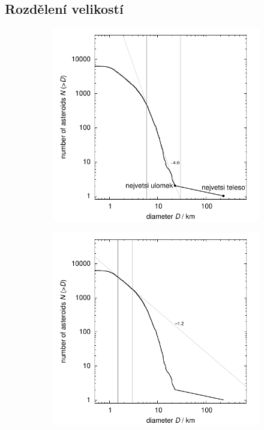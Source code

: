 \documentclass[A4paper, 12pt, oneside, openany]{book}
\begin{document}
\subsection{Rozdělení velikostí}
\begin{figure}
	\centering
	\begin{subfigure}[b]{0.45\textwidth}
	\includegraphics[width=\textwidth]{obr/size_distribution}
	\end{subfigure}
	\begin{subfigure}[b]{0.45\textwidth}
	\includegraphics[width=\textwidth]{obr/size_distribution_SMALLD}

\end{subfigure}
\end{figure}
\end{document}
